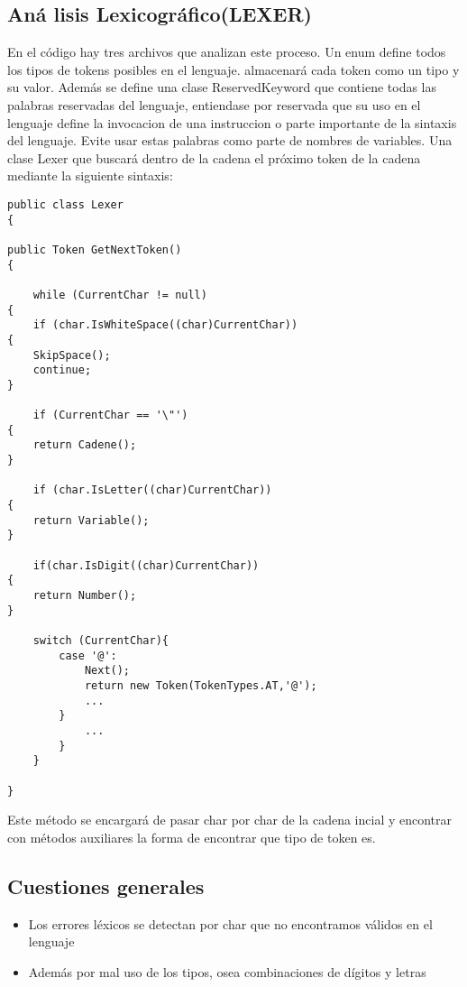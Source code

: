 \documentclass[a4paper,12pt]{article}
\begin{document}
\subsection{An\'a lisis Lexicogr\'afico(LEXER)}\label{sub:center}
    En el c\'odigo hay tres archivos que analizan este proceso. Un enum define todos los tipos de tokens posibles en el lenguaje.
    almacenar\'a cada token como un tipo y su valor. Adem\'as se define una clase ReservedKeyword que contiene todas las palabras reservadas del lenguaje, entiendase por reservada que su uso en el lenguaje define la invocacion de una instruccion o parte importante de la sintaxis del lenguaje. Evite usar estas palabras como parte de nombres de variables.
    Una clase Lexer que buscar\'a dentro de la cadena el pr\'oximo token de la cadena mediante la siguiente sintaxis:
\begin{lstlisting}[style=csharp]
public class Lexer
{
    
public Token GetNextToken()
{
        
    while (CurrentChar != null)
{
    if (char.IsWhiteSpace((char)CurrentChar))
{
    SkipSpace(); 
    continue;
}

    if (CurrentChar == '\"')
{
    return Cadene();
}

    if (char.IsLetter((char)CurrentChar))
{
    return Variable();
}           

    if(char.IsDigit((char)CurrentChar))
{
    return Number();
}

    switch (CurrentChar){
        case '@':
            Next();
            return new Token(TokenTypes.AT,'@');
            ...
        }
            ... 
        }
    }
            
}
    \end{lstlisting}

    Este m\'etodo se encargar\'a de pasar char por char de la cadena incial y encontrar con m\'etodos auxiliares la forma de encontrar que tipo de token es.

    \subsection*{Cuestiones generales}
    \begin{itemize}
        \item Los errores l\'exicos se detectan por char que no encontramos v\'alidos en el lenguaje
        \item Adem\'as por mal uso de los tipos, osea combinaciones de d\'igitos y letras
    \end{itemize}
\end{document}
